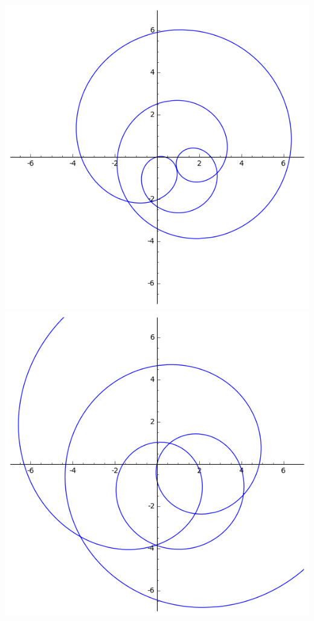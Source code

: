 \documentclass[class=report,crop=false]{standalone}
\begin{document}
\begin{center}
  \includegraphics[scale=0.3]{figures/polynome4}\quad
\includegraphics[scale=0.3]{figures/polynome5}\quad

\end{center}
\end{document}
